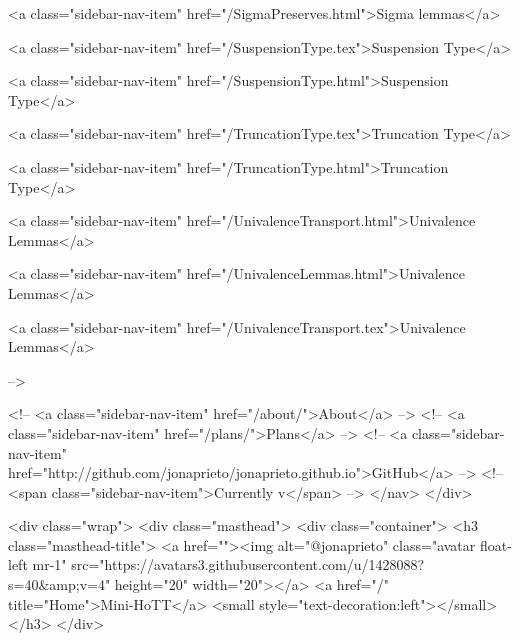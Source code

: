       
    
      
        
          <a class="sidebar-nav-item" href="/SigmaPreserves.html">Sigma lemmas</a>
        
      
    
      
        
          <a class="sidebar-nav-item" href="/SuspensionType.tex">Suspension Type</a>
        
      
    
      
        
          <a class="sidebar-nav-item" href="/SuspensionType.html">Suspension Type</a>
        
      
    
      
        
          <a class="sidebar-nav-item" href="/TruncationType.tex">Truncation Type</a>
        
      
    
      
        
          <a class="sidebar-nav-item" href="/TruncationType.html">Truncation Type</a>
        
      
    
      
        
          <a class="sidebar-nav-item" href="/UnivalenceTransport.html">Univalence Lemmas</a>
        
      
    
      
        
          <a class="sidebar-nav-item" href="/UnivalenceLemmas.html">Univalence Lemmas</a>
        
      
    
      
        
          <a class="sidebar-nav-item" href="/UnivalenceTransport.tex">Univalence Lemmas</a>
        
      
     -->

    <!-- <a class="sidebar-nav-item" href="/about/">About</a> -->
    <!-- <a class="sidebar-nav-item" href="/plans/">Plans</a> -->
    <!-- <a class="sidebar-nav-item" href="http://github.com/jonaprieto/jonaprieto.github.io">GitHub</a> -->
    <!-- <span class="sidebar-nav-item">Currently v</span> -->
  </nav>
</div>

    <div class="wrap">
      <div class="masthead">
        <div class="container">
          <h3 class="masthead-title">
            <a href=""><img alt="@jonaprieto" class="avatar float-left mr-1" src="https://avatars3.githubusercontent.com/u/1428088?s=40&amp;v=4" height="20" width="20"></a>
            <a href="/" title="Home">Mini-HoTT</a>
            <small style="text-decoration:left"></small>
          </h3>
        </div>
      
